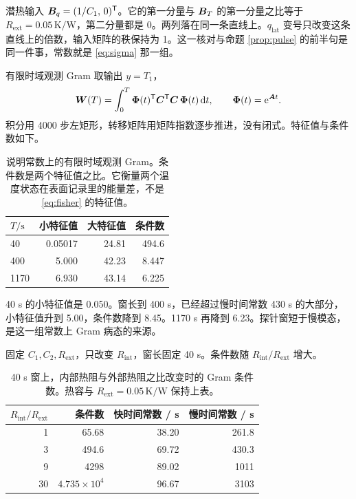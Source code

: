 潜热输入 \(\bm{B}_q=(1/C_1,\,0)^{\mathsf T}\)。它的第一分量与 \(\bm{B}_T\) 的第一分量之比等于 \(R_{\mathrm{ext}}=0.05\,\mathrm{K/W}\)，第二分量都是 0。两列落在同一条直线上。\(q_{\mathrm{lat}}\) 变号只改变这条直线上的倍数，输入矩阵的秩保持为 1。这一核对与命题 \ref{prop:pulse} 的前半句是同一件事，常数就是 \eqref{eq:sigma} 那一组。

有限时域观测 Gram 取输出 \(y=T_1\)，
\begin{equation}
\label{eq:gram}
\bm{W}(T)=\int_0^{T}\bm{\Phi}(t)^{\mathsf T}\bm{C}^{\mathsf T}\bm{C}\,\bm{\Phi}(t)\,\mathrm{d}t,
\qquad
\bm{\Phi}(t)=\mathrm{e}^{\bm{A}t}.
\end{equation}
积分用 4000 步左矩形，转移矩阵用矩阵指数逐步推进，没有闭式。特征值与条件数如下。

\begin{table}[ht]
\centering
\caption{说明常数上的有限时域观测 Gram。条件数是两个特征值之比。它衡量两个温度状态在表面记录里的能量差，不是 \eqref{eq:fisher} 的特征值。}
\begin{tabular}{lrrr}
\toprule
\(T/\mathrm{s}\) & 小特征值 & 大特征值 & 条件数 \\
\midrule
40 & 0.05017 & 24.81 & 494.6 \\
400 & 5.000 & 42.23 & 8.447 \\
1170 & 6.930 & 43.14 & 6.225 \\
\bottomrule
\end{tabular}
\end{table}

40 s 的小特征值是 0.050。窗长到 400 s，已经超过慢时间常数 430 s 的大部分，小特征值升到 5.00，条件数降到 8.45。1170 s 再降到 6.23。探针窗短于慢模态，是这一组常数上 Gram 病态的来源。

固定 \(C_1,C_2,R_{\mathrm{ext}}\)，只改变 \(R_{\mathrm{int}}\)，窗长固定 40 s。条件数随 \(R_{\mathrm{int}}/R_{\mathrm{ext}}\) 增大。

\begin{table}[ht]
\centering
\caption{40 s 窗上，内部热阻与外部热阻之比改变时的 Gram 条件数。热容与 \(R_{\mathrm{ext}}=0.05\,\mathrm{K/W}\) 保持上表。}
\begin{tabular}{rrrr}
\toprule
\(R_{\mathrm{int}}/R_{\mathrm{ext}}\) & 条件数 & 快时间常数 / s & 慢时间常数 / s \\
\midrule
1 & 65.68 & 38.20 & 261.8 \\
3 & 494.6 & 69.72 & 430.3 \\
9 & 4298 & 89.02 & 1011 \\
30 & \(4.735\times 10^{4}\) & 96.67 & 3103 \\
\bottomrule
\end{tabular}
\end{table}

